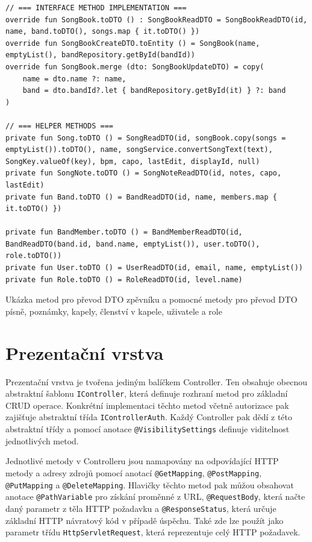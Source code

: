 \begin{listing}
\begin{verbatim}
// === INTERFACE METHOD IMPLEMENTATION ===
override fun SongBook.toDTO () : SongBookReadDTO = SongBookReadDTO(id, name, band.toDTO(), songs.map { it.toDTO() })
override fun SongBookCreateDTO.toEntity () = SongBook(name, emptyList(), bandRepository.getById(bandId))
override fun SongBook.merge (dto: SongBookUpdateDTO) = copy(
    name = dto.name ?: name,
    band = dto.bandId?.let { bandRepository.getById(it) } ?: band
)

// === HELPER METHODS ===
private fun Song.toDTO () = SongReadDTO(id, songBook.copy(songs = emptyList()).toDTO(), name, songService.convertSongText(text), SongKey.valueOf(key), bpm, capo, lastEdit, displayId, null)
private fun SongNote.toDTO () = SongNoteReadDTO(id, notes, capo, lastEdit)
private fun Band.toDTO () = BandReadDTO(id, name, members.map { it.toDTO() })

private fun BandMember.toDTO () = BandMemberReadDTO(id, BandReadDTO(band.id, band.name, emptyList()), user.toDTO(), role.toDTO())
private fun User.toDTO () = UserReadDTO(id, email, name, emptyList())
private fun Role.toDTO () = RoleReadDTO(id, level.name)
\end{verbatim}
\caption[Ukázka třídy Service pro zpěvník]{Ukázka metod pro převod DTO zpěvníku a pomocné metody pro převod DTO písně, poznámky, kapely, členství v kapele, uživatele a role}
\end{listing}

\section{Prezentační vrstva}

Prezentační vrstva je tvořena jediným balíčkem Controller. Ten obsahuje obecnou abstraktní šablonu \texttt{IController}, která definuje rozhraní metod pro základní CRUD operace. Konkrétní implementaci těchto metod včetně autorizace pak zajišťuje abstraktní třída \texttt{IControllerAuth}. Každý Controller pak dědí z této abstraktní třídy a pomocí anotace \texttt{@VisibilitySettings} definuje viditelnost jednotlivých metod.

Jednotlivé metody v Controlleru jsou namapovány na odpovídající HTTP metody a adresy zdrojů pomocí anotací \texttt{@GetMapping}, \texttt{@PostMapping}, \texttt{@PutMapping} a \texttt{@DeleteMapping}. Hlavičky těchto metod pak můžou obsahovat anotace \texttt{@PathVariable} pro získání proměnné z URL, \texttt{@RequestBody}, která načte daný parametr z těla HTTP požadavku a \texttt{@ResponseStatus}, která určuje základní HTTP návratový kód v případě úspěchu. Také zde lze použít jako parametr třídu \texttt{HttpServletRequest}, která reprezentuje celý HTTP požadavek.

